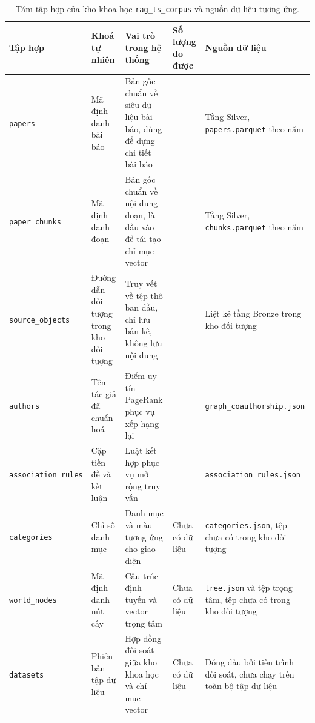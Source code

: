 \begin{table}[htbp]
    \centering
    \caption{Tám tập hợp của kho khoa học \texttt{rag\_ts\_corpus} và nguồn dữ liệu tương ứng.}
    \label{tab:tam-tap-hop-corpus}
    \footnotesize
    \begin{tabularx}{\textwidth}{@{}>{\raggedright\arraybackslash}p{2.9cm}>{\raggedright\arraybackslash}p{2.8cm}>{\raggedright\arraybackslash}p{3.9cm}>{\raggedright\arraybackslash}p{2.1cm}>{\raggedright\arraybackslash}X@{}}
        \toprule
        \textbf{Tập hợp} & \textbf{Khoá tự nhiên} & \textbf{Vai trò trong hệ thống} & \textbf{Số lượng đo được} & \textbf{Nguồn dữ liệu} \\
        \midrule
        \texttt{papers} & Mã định danh bài báo & Bản gốc chuẩn về siêu dữ liệu bài báo, dùng để dựng chi tiết bài báo & 70.590 & Tầng Silver, \texttt{papers.\allowbreak parquet} theo năm \\
        \texttt{paper\_chunks} & Mã định danh đoạn & Bản gốc chuẩn về nội dung đoạn, là đầu vào để tái tạo chỉ mục vector & 913.205 & Tầng Silver, \texttt{chunks.\allowbreak parquet} theo năm \\
        \texttt{source\_objects} & Đường dẫn đối tượng trong kho đối tượng & Truy vết về tệp thô ban đầu, chỉ lưu bản kê, không lưu nội dung & 136.823 & Liệt kê tầng Bronze trong kho đối tượng \\
        \texttt{authors} & Tên tác giả đã chuẩn hoá & Điểm uy tín PageRank phục vụ xếp hạng lại & 120 & \texttt{graph\_\allowbreak coauthorship.\allowbreak json} \\
        \texttt{association\_\allowbreak rules} & Cặp tiền đề và kết luận & Luật kết hợp phục vụ mở rộng truy vấn & 40 & \texttt{association\_\allowbreak rules.json} \\
        \texttt{categories} & Chỉ số danh mục & Danh mục và màu tương ứng cho giao diện & Chưa có dữ liệu & \texttt{categories.\allowbreak json}, tệp chưa có trong kho đối tượng \\
        \texttt{world\_nodes} & Mã định danh nút cây & Cấu trúc định tuyến và vector trọng tâm & Chưa có dữ liệu & \texttt{tree.json} và tệp trọng tâm, tệp chưa có trong kho đối tượng \\
        \texttt{datasets} & Phiên bản tập dữ liệu & Hợp đồng đối soát giữa kho khoa học và chỉ mục vector & Chưa có dữ liệu & Đóng dấu bởi tiến trình đối soát, chưa chạy trên toàn bộ tập dữ liệu \\
        \bottomrule
    \end{tabularx}
\end{table}

